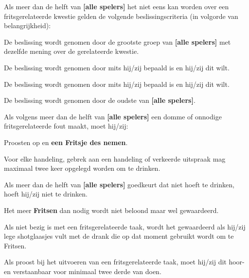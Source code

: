 \vervolgLijst{}
    \item \label{item:beslissingCriteria} Als meer dan de helft van \textbf{[alle spelers]} het niet eens kan worden over een fritsgerelateerde kwestie gelden de volgende beslissingscriteria (in volgorde van belangrijkheid):
    \numeriekeLijst{}
        \item De beslissing wordt genomen door de grootste groep van \textbf{[alle spelers]} met dezelfde mening over de gerelateerde kwestie. 
        \item De beslissing wordt genomen door \Frits mits hij/zij bepaald is en hij/zij dit wilt.
        \item De beslissing wordt genomen door \Willem mits hij/zij bepaald is en hij/zij dit wilt.
        \item De beslissing wordt genomen door de oudste van \textbf{[alle spelers]}.
    \eindNumeriekeLijst{}
\eindLijst{}

\vervolgLijst{}
    \item Als \eenSpeler volgens meer dan de helft van \textbf{[alle spelers]} een domme of onnodige fritsgerelateerde fout maakt, moet hij/zij:
    \puntLijst{}
        \item Proosten op  en \textbf{een Fritsje des nemen}\footnotemark[1].
    \eindPuntLijst{}
\eindLijst{}  

\vervolgLijst{}
    \item Voor elke handeling, gebrek aan een handeling of verkeerde uitspraak mag \eenSpeler maximaal twee keer opgelegd worden om te drinken.
\eindLijst{}   

\vervolgLijst{}
    \item Als meer dan de helft van \textbf{[alle spelers]} goedkeurt dat \eenSpeler niet hoeft te drinken, hoeft hij/zij niet te drinken.
\eindLijst{}   

\vervolgLijst{}
    \item Het meer \textbf{Fritsen} dan nodig wordt niet beloond maar wel gewaardeerd.
\eindLijst{}   

\vervolgLijst{}
    \item Als \eenSpeler niet bezig is met een fritsgerelateerde taak, wordt het gewaardeerd als hij/zij lege shotglaasjes vult met de drank die op dat moment gebruikt wordt om te Fritsen.
\eindLijst{}   

\vervolgLijst{}
    \item Als \eenSpeler proost bij het uitvoeren van een fritsgerelateerde taak, moet hij/zij dit hoor- en verstaanbaar voor minimaal twee derde van \alleSpelers doen.
\eindLijst{} 

